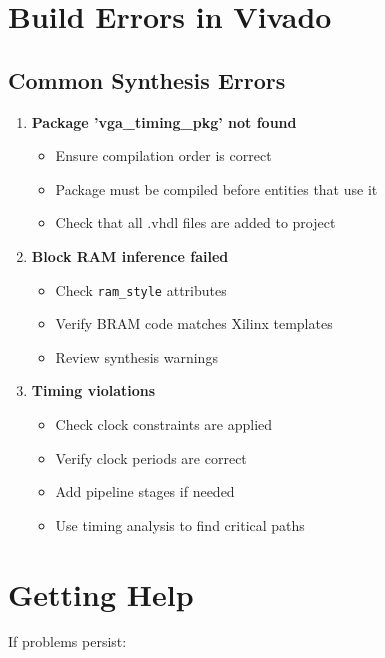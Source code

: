 \documentclass[11pt,letterpaper]{report}
\begin{document}
\section{Build Errors in Vivado}

\subsection{Common Synthesis Errors}

\begin{enumerate}
    \item \textbf{Package 'vga\_timing\_pkg' not found}
    \begin{itemize}
        \item Ensure compilation order is correct
        \item Package must be compiled before entities that use it
        \item Check that all .vhdl files are added to project
    \end{itemize}
    
    \item \textbf{Block RAM inference failed}
    \begin{itemize}
        \item Check \texttt{ram\_style} attributes
        \item Verify BRAM code matches Xilinx templates
        \item Review synthesis warnings
    \end{itemize}
    
    \item \textbf{Timing violations}
    \begin{itemize}
        \item Check clock constraints are applied
        \item Verify clock periods are correct
        \item Add pipeline stages if needed
        \item Use timing analysis to find critical paths
    \end{itemize}
\end{enumerate}

\section{Getting Help}

If problems persist:
\end{document}

